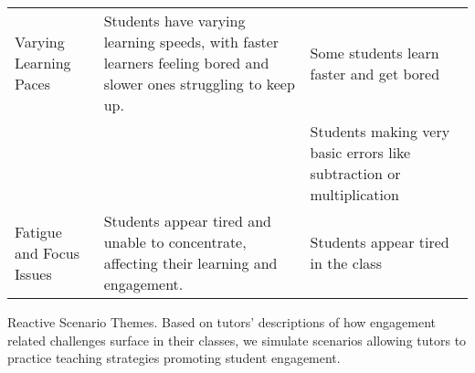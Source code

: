 {\begin{table*}
\begin{tabular}{p{150pt}p{150pt}p{150pt}}
                                \hline
Varying Learning Paces          & Students have varying learning speeds, with faster learners feeling bored and slower ones struggling to keep up.                & Some students learn faster and get bored                                  \\
                                &                      & Students making very basic errors like subtraction or multiplication      \\
                                \hline
Fatigue and Focus Issues        & Students appear tired and unable to concentrate, affecting their learning and engagement.                & Students appear tired in the class                                        \\
\bottomrule
\end{tabular}
\end{table*}}{\begin{table*}
\centering
\caption{Reactive Scenario Themes. Based on tutors' descriptions of how engagement related challenges surface in their classes, we simulate scenarios allowing tutors to practice teaching strategies promoting student engagement.}
\label{tab:reactiv_scenarios} %


\end{table*}}
